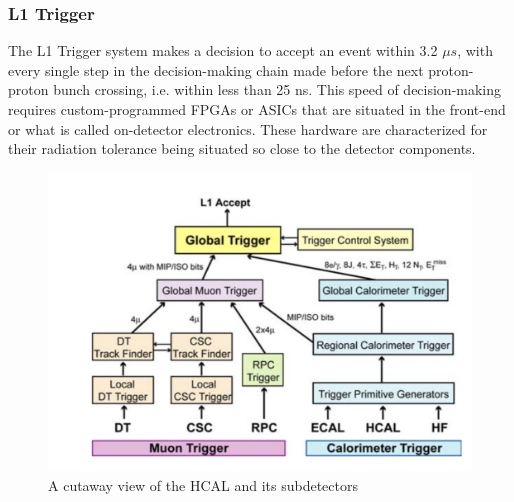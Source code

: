 \subsubsection{L1 Trigger}
The L1 Trigger system makes a decision to accept an event within 3.2 $\mu s$, with every single step in the decision-making chain made before the next proton-proton bunch crossing, i.e. within less than 25 ns. This speed of decision-making requires custom-programmed FPGAs or ASICs that are situated in the front-end or what is called on-detector electronics. These hardware are characterized for their radiation tolerance being situated so close to the detector components. 

\begin{figure}[tbp!]
\begin{center}
\includegraphics[scale=0.6]{fig/L1Trigger.png}
\end{center}
\caption{A cutaway view of the HCAL and its subdetectors \cite{CMS:2008xjf}
}
\label{fig:L1Trigger}
\end{figure}

